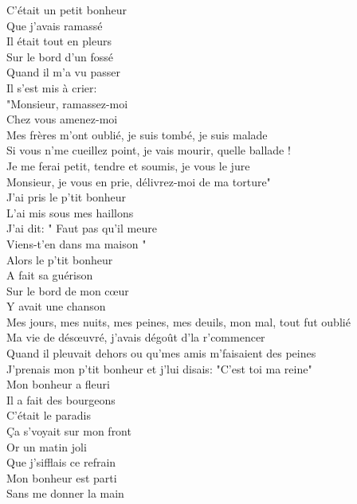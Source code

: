 \documentclass{novel}
\begin{document}
\begin{multicols}{2}
C'était un petit bonheur \\
Que j'avais ramassé \\
Il était tout en pleurs \\
Sur le bord d'un fossé \\
Quand il m'a vu passer \\
Il s'est mis à crier: \\
"Monsieur, ramassez-moi \\
Chez vous amenez-moi \\

Mes frères m'ont oublié, je suis tombé, je suis malade \\
Si vous n'me cueillez point, je vais mourir, quelle ballade ! \\
Je me ferai petit, tendre et soumis, je vous le jure \\
Monsieur, je vous en prie, délivrez-moi de ma torture" \\

J'ai pris le p'tit bonheur \\
L'ai mis sous mes haillons \\
J'ai dit: " Faut pas qu'il meure \\
Viens-t'en dans ma maison " \\
Alors le p'tit bonheur \\
A fait sa guérison \\
Sur le bord de mon cœur \\
Y avait une chanson \\

Mes jours, mes nuits, mes peines, mes deuils, mon mal, tout fut oublié \\
Ma vie de désœuvré, j'avais dégoût d'la r'commencer \\
Quand il pleuvait dehors ou qu'mes amis m'faisaient des peines \\
J'prenais mon p'tit bonheur et j'lui disais: "C'est toi ma reine" \\

Mon bonheur a fleuri \\
Il a fait des bourgeons \\
C'était le paradis \\
Ça s'voyait sur mon front \\
Or un matin joli \\
Que j'sifflais ce refrain \\
Mon bonheur est parti \\
Sans me donner la main \\


\end{multicols}
\end{document}

